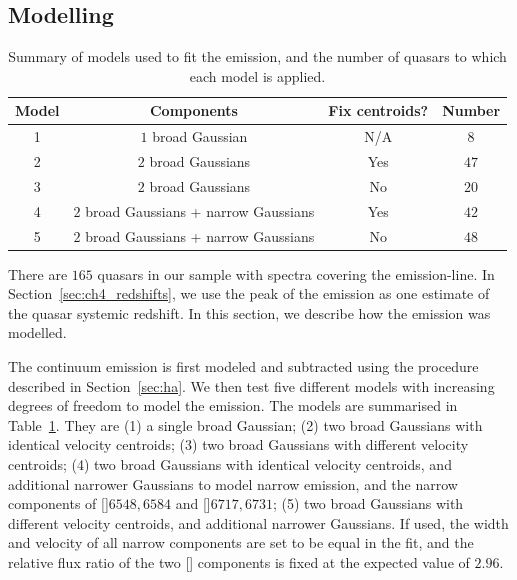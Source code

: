 \subsection{Modelling \hans}
\label{sec:hamodel}

\begin{table}
  \centering
  \footnotesize 
    \begin{tabular}{cccc} 
    \hline
    Model     & Components & Fix centroids? & Number \\
    \hline
    1        & $1$ broad Gaussian  & N/A &  $8$ \\
    2        & $2$ broad Gaussians & Yes &  $47$ \\
    3        & $2$ broad Gaussians & No  &  $20$ \\
    4        & $2$ broad Gaussians + narrow Gaussians & Yes & $42$ \\
    5        & $2$ broad Gaussians + narrow Gaussians & No  & $48$ \\
    \hline
    \end{tabular}
    \caption[{Summary of models used to fit the \ha emission, and the number of quasars to which each model is applied.}]{Summary of models used to fit the \ha emission, and the number of quasars to which each model is applied.}
  \label{tab:hamod}
\end{table} 

There are $165$ quasars in our sample with spectra covering the \ha emission-line. 
In Section~\ref{sec:ch4_redshifts}, we use the peak of the \ha emission as one estimate of the quasar systemic redshift. 
In this section, we describe how the \ha emission was modelled. 

The continuum emission is first modeled and subtracted using the procedure described in Section~\ref{sec:ha}. 
We then test five different models with increasing degrees of freedom to model the \ha emission. 
The models are summarised in Table~\ref{tab:hamod}. 
They are (1) a single broad Gaussian; (2) two broad Gaussians with identical velocity centroids; (3) two broad Gaussians with different velocity centroids; (4) two broad Gaussians with identical velocity centroids, and additional narrower Gaussians to model narrow \ha emission, and the narrow components of []\ll$6548,6584$ and []\ll$6717,6731$; (5) two broad Gaussians with different velocity centroids, and additional narrower Gaussians. 
If used, the width and velocity of all narrow components are set to be equal in the fit, and the relative flux ratio of the two [] components is fixed at the expected value of $2.96$.

